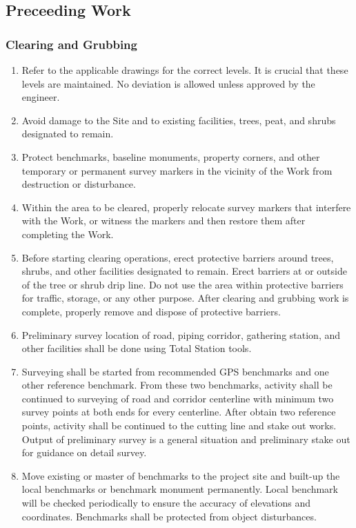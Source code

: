 \documentclass{article}%
\begin{document}
%
\subsection{Preceeding Work}%
\label{subsec:PreceedingWork}%
\subsubsection{Clearing and Grubbing}%
\label{ssubsec:ClearingandGrubbing}%
\begin{enumerate}[label=\alph*),start=1]%
\item%
Refer to the applicable drawings for the correct levels. It is crucial that these levels are maintained. No deviation is allowed unless approved by the engineer.%
\item%
Avoid damage to the Site and to existing facilities, trees, peat, and shrubs designated to remain.%
\item%
Protect benchmarks,  baseline  monuments,  property  corners,  and other temporary or permanent survey markers in the vicinity of the Work from destruction or disturbance.%
\item%
Within the area to be cleared, properly relocate survey markers that interfere with the Work, or witness the markers and then restore them after completing the Work.%
\item%
Before starting clearing operations, erect protective barriers around trees, shrubs, and other facilities designated to remain. Erect barriers at or outside of the tree or shrub drip line. Do not use the area within protective barriers for traffic, storage, or any other purpose. After clearing and grubbing work is complete, properly remove and dispose of protective barriers.%
\item%
Preliminary survey location of road, piping corridor, gathering station, and other facilities shall be done using Total Station tools.%
\item%
Surveying shall be started from recommended GPS benchmarks and one other reference benchmark. From these two benchmarks, activity shall be continued to surveying of road and corridor centerline with minimum two survey points at both ends for every centerline. After obtain two reference points, activity shall be continued to the cutting line and stake out works. Output of preliminary survey is a general situation and preliminary stake out for guidance on detail survey.%
\item%
Move existing or master of benchmarks to the project site and built{-}up the local benchmarks or benchmark monument permanently. Local benchmark will be checked periodically to ensure the accuracy of elevations and coordinates. Benchmarks shall be protected from object disturbances.%

\end{enumerate}
\end{document}
